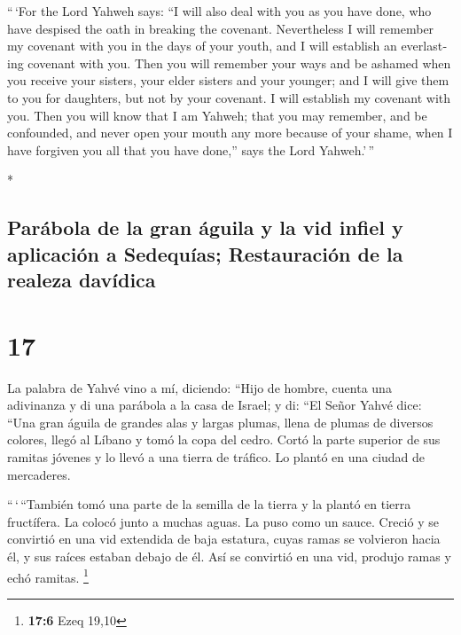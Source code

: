\begin{paracol}{2}
\begin{otherlanguage}{english}
 ``\,`For the Lord Yahweh says: ``I will also deal with
you as you have done, who have despised the oath in breaking the
covenant.  Nevertheless I will remember my covenant with
you in the days of your youth, and I will establish an everlasting
covenant with you.  Then you will remember your ways and
be ashamed when you receive your sisters, your elder sisters and your
younger; and I will give them to you for daughters, but not by your
covenant.  I will establish my covenant with you. Then
you will know that I am Yahweh;  that you may remember,
and be confounded, and never open your mouth any more because of your
shame, when I have forgiven you all that you have done,'' says the Lord
Yahweh.'\,''

\end{otherlanguage}

\switchcolumn[0]*

\hypertarget{paruxe1bola-de-la-gran-uxe1guila-y-la-vid-infiel-y-aplicaciuxf3n-a-sedequuxedas-restauraciuxf3n-de-la-realeza-davuxeddica}{%
\subsection{Parábola de la gran águila y la vid infiel y aplicación a
Sedequías; Restauración de la realeza
davídica}\label{paruxe1bola-de-la-gran-uxe1guila-y-la-vid-infiel-y-aplicaciuxf3n-a-sedequuxedas-restauraciuxf3n-de-la-realeza-davuxeddica}}

\hypertarget{section-32}{%
\section{17}\label{section-32}}

 La palabra de Yahvé vino a mí, diciendo: 
``Hijo de hombre, cuenta una adivinanza y di una parábola a la casa de
Israel;  y di: ``El Señor Yahvé dice: ``Una gran águila de
grandes alas y largas plumas, llena de plumas de diversos colores, llegó
al Líbano y tomó la copa del cedro.  Cortó la parte
superior de sus ramitas jóvenes y lo llevó a una tierra de tráfico. Lo
plantó en una ciudad de mercaderes.

 ``\,`\,``También tomó una parte de la semilla de la
tierra y la plantó en tierra fructífera. La colocó junto a muchas aguas.
La puso como un sauce.  Creció y se convirtió en una vid
extendida de baja estatura, cuyas ramas se volvieron hacia él, y sus
raíces estaban debajo de él. Así se convirtió en una vid, produjo ramas
y echó ramitas. \footnote{\textbf{17:6} Ezeq 19,10}


\end{paracol}
